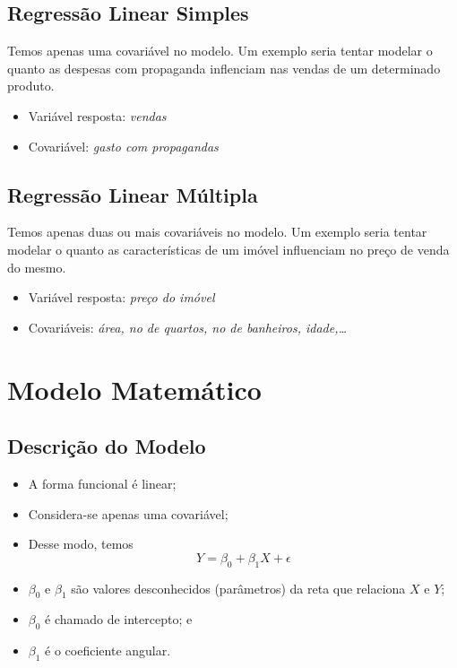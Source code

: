 \documentclass[
  letterpaper,
  DIV=11,
  numbers=noendperiod]{scrartcl}
\begin{document}
\subsection{Regressão Linear Simples}\label{regressuxe3o-linear-simples}

Temos apenas uma covariável no modelo. Um exemplo seria tentar modelar o
quanto as despesas com propaganda inflenciam nas vendas de um
determinado produto.

\begin{itemize}
\item
  Variável resposta: \emph{vendas}
\item
  Covariável: \emph{gasto com propagandas}
\end{itemize}

\subsection{Regressão Linear
Múltipla}\label{regressuxe3o-linear-muxfaltipla}

Temos apenas duas ou mais covariáveis no modelo. Um exemplo seria tentar
modelar o quanto as características de um imóvel influenciam no preço de
venda do mesmo.

\begin{itemize}
\item
  Variável resposta: \emph{preço do imóvel}
\item
  Covariáveis: \emph{área, no de quartos, no de banheiros,
  idade,\ldots{}}
\end{itemize}

\section{Modelo Matemático}\label{modelo-matemuxe1tico}

\subsection{Descrição do Modelo}\label{descriuxe7uxe3o-do-modelo}

\begin{itemize}
\item
  A forma funcional é linear;
\item
  Considera-se apenas uma covariável;
\item
  Desse modo, temos \[Y=\beta_0+\beta_1X+\epsilon\]
\item
  \(\beta_0\) e \(\beta_1\) são valores desconhecidos (parâmetros) da
  reta que relaciona \(X\) e \(Y\);
\item
  \(\beta_0\) é chamado de intercepto; e
\item
  \(\beta_1\) é o coeficiente angular.
\end{itemize}
\end{document}
